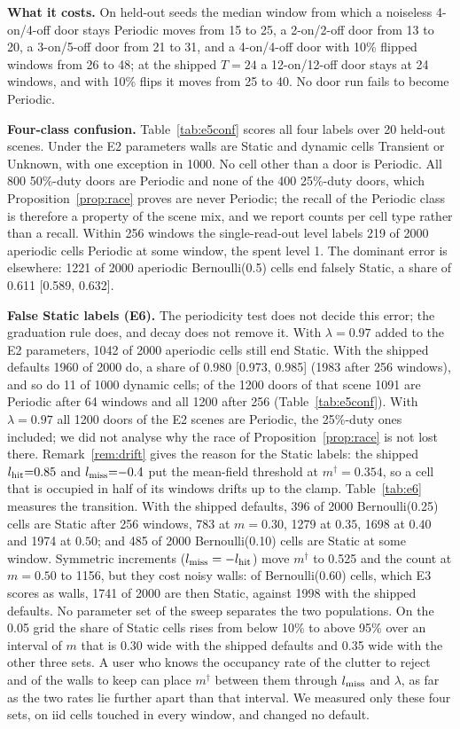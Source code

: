 \noindent\textbf{What it costs.} On held-out seeds the median window from which a noiseless 4-on/4-off door stays Periodic moves from 15 to 25, a 2-on/2-off door from 13 to 20, a 3-on/5-off door from 21 to 31, and a 4-on/4-off door with 10\% flipped windows from 26 to 48; at the shipped $T{=}24$ a 12-on/12-off door stays at 24 windows, and with 10\% flips it moves from 25 to 40. No door run fails to become Periodic.

\noindent\textbf{Four-class confusion.} Table~\ref{tab:e5conf} scores all four labels over 20 held-out scenes. Under the E2 parameters walls are Static and dynamic cells Transient or Unknown, with one exception in 1000. No cell other than a door is Periodic. All 800 50\%-duty doors are Periodic and none of the 400 25\%-duty doors, which Proposition~\ref{prop:race} proves are never Periodic; the recall of the Periodic class is therefore a property of the scene mix, and we report counts per cell type rather than a recall. Within 256 windows the single-read-out level labels 219 of 2000 aperiodic cells Periodic at some window, the spent level 1. The dominant error is elsewhere: 1221 of 2000 aperiodic Bernoulli(0.5) cells end falsely Static, a share of 0.611 [0.589, 0.632].



\noindent\textbf{False Static labels (E6).} The periodicity test does not decide this error; the graduation rule does, and decay does not remove it. With $\lambda{=}0.97$ added to the E2 parameters, 1042 of 2000 aperiodic cells still end Static. With the shipped defaults 1960 of 2000 do, a share of 0.980 [0.973, 0.985] (1983 after 256 windows), and so do 11 of 1000 dynamic cells; of the 1200 doors of that scene 1091 are Periodic after 64 windows and all 1200 after 256 (Table~\ref{tab:e5conf}). With $\lambda{=}0.97$ all 1200 doors of the E2 scenes are Periodic, the 25\%-duty ones included; we did not analyse why the race of Proposition~\ref{prop:race} is not lost there. Remark~\ref{rem:drift} gives the reason for the Static labels: the shipped $l_{\mathrm{hit}}{=}0.85$ and $l_{\mathrm{miss}}{=}{-}0.4$ put the mean-field threshold at $m^\dagger=0.354$, so a cell that is occupied in half of its windows drifts up to the clamp. Table~\ref{tab:e6} measures the transition. With the shipped defaults, 396 of 2000 Bernoulli(0.25) cells are Static after 256 windows, 783 at $m{=}0.30$, 1279 at $0.35$, 1698 at $0.40$ and 1974 at $0.50$; and 485 of 2000 Bernoulli(0.10) cells are Static at some window. Symmetric increments ($l_{\mathrm{miss}}=-l_{\mathrm{hit}}$) move $m^\dagger$ to 0.525 and the count at $m{=}0.50$ to 1156, but they cost noisy walls: of Bernoulli(0.60) cells, which E3 scores as walls, 1741 of 2000 are then Static, against 1998 with the shipped defaults. No parameter set of the sweep separates the two populations. On the 0.05 grid the share of Static cells rises from below 10\% to above 95\% over an interval of $m$ that is 0.30 wide with the shipped defaults and 0.35 wide with the other three sets. A user who knows the occupancy rate of the clutter to reject and of the walls to keep can place $m^\dagger$ between them through $l_{\mathrm{miss}}$ and $\lambda$, as far as the two rates lie further apart than that interval. We measured only these four sets, on iid cells touched in every window, and changed no default.

